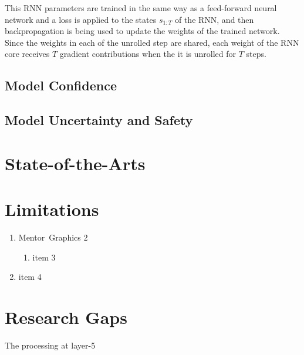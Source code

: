 This RNN parameters are trained in the same way as a feed-forward neural network and a loss is applied to the states $s_{1:T}$ of the RNN, and then backpropagation is being used to update the weights of the trained network.
Since the weights in each of the unrolled step are shared, each weight of the RNN core receives $T$ gradient contributions when the it is unrolled for $T$ steps.


\subsection{Model Confidence}

\subsection{Model Uncertainty and Safety}

\section{State-of-the-Arts}

\section{Limitations}
\begin{enumerate}
\item Mentor~Graphics 2
\begin{enumerate}
\item item 3
\end{enumerate}
\item item 4
\end{enumerate}

\section{Research Gaps}
The processing at layer-5%
